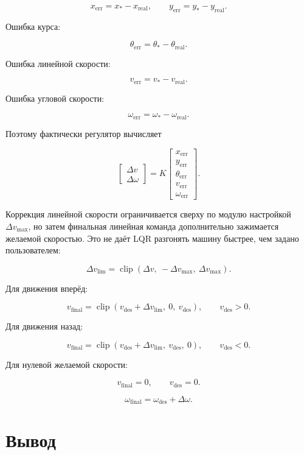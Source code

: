 \documentclass[12pt,a4paper]{article}
\begin{document}
\[
x_{\mathrm{err}} = x_{*} - x_{\mathrm{real}},
\qquad
y_{\mathrm{err}} = y_{*} - y_{\mathrm{real}}.
\]

Ошибка курса:

\[
\theta_{\mathrm{err}} = \theta_{*} - \theta_{\mathrm{real}}.
\]

Ошибка линейной скорости:

\[
v_{\mathrm{err}} = v_{*} - v_{\mathrm{real}}.
\]

Ошибка угловой скорости:

\[
\omega_{\mathrm{err}} = \omega_{*} - \omega_{\mathrm{real}}.
\]

Поэтому фактически регулятор вычисляет

\[
\begin{bmatrix}
\Delta v \\
\Delta \omega
\end{bmatrix}
=
K
\begin{bmatrix}
x_{\mathrm{err}} \\
y_{\mathrm{err}} \\
\theta_{\mathrm{err}} \\
v_{\mathrm{err}} \\
\omega_{\mathrm{err}}
\end{bmatrix}.
\]

Коррекция линейной скорости ограничивается сверху по модулю настройкой
\(\Delta v_{\max}\), но затем финальная линейная команда дополнительно
зажимается желаемой скоростью. Это не даёт LQR разгонять машину быстрее,
чем задано пользователем:

\[
\Delta v_{\mathrm{lim}}
=
\operatorname{clip}(\Delta v,\ -\Delta v_{\max},\ \Delta v_{\max}).
\]

Для движения вперёд:

\[
v_{\mathrm{final}}
=
\operatorname{clip}(v_{\mathrm{des}} + \Delta v_{\mathrm{lim}},\ 0,\ v_{\mathrm{des}}),
\qquad v_{\mathrm{des}} > 0.
\]

Для движения назад:

\[
v_{\mathrm{final}}
=
\operatorname{clip}(v_{\mathrm{des}} + \Delta v_{\mathrm{lim}},\ v_{\mathrm{des}},\ 0),
\qquad v_{\mathrm{des}} < 0.
\]

Для нулевой желаемой скорости:

\[
v_{\mathrm{final}} = 0,
\qquad v_{\mathrm{des}} = 0.
\]

\[
\omega_{\mathrm{final}} = \omega_{\mathrm{des}} + \Delta \omega.
\]

\section{Вывод}
\end{document}
